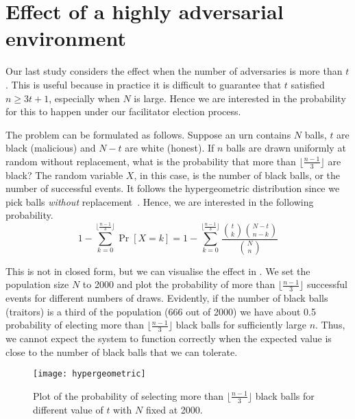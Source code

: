 \section{Effect of a highly adversarial environment}

Our last study considers the effect when the number of adversaries is more than $t$.
This is useful because in practice it is difficult to guarantee that $t$ satisfied $n \ge 3t + 1$, especially when $N$ is large.
Hence we are interested in the probability for this to happen under our facilitator election process.

The problem can be formulated as follows.
Suppose an urn contains $N$ balls, $t$ are black (malicious) and $N-t$ are white (honest).
If $n$ balls are drawn uniformly at random without replacement,
what is the probability that more than $\lfloor \frac{n-1}{3} \rfloor$ are black?
The random variable $X$, in this case, is the number of black balls, or the number of successful events.
It follows the hypergeometric distribution since we pick balls \emph{without} replacement~\cite{skala2013hypergeometric}.
Hence, we are interested in the following probability.
$$
1 - \sum_{k = 0}^{\lfloor \frac{n-1}{3} \rfloor} \Pr[X = k] = 
1 - \sum_{k = 0}^{\lfloor \frac{n-1}{3} \rfloor} \frac{ \binom{t}{k} \binom{N-t}{n-k} }{ \binom{N}{n} }
$$

This is not in closed form,
but we can visualise the effect in .
We set the population size $N$ to 2000
and plot the probability of more than $\lfloor \frac{n-1}{3} \rfloor$ successful events for different numbers of draws.
Evidently,
if the number of black balls (traitors) is a third of the population (666 out of 2000)
we have about 0.5 probability of electing more than $\lfloor \frac{n-1}{3} \rfloor$ black balls for sufficiently large $n$.
Thus, we cannot expect the system to function correctly when 
the expected value is close to the number of black balls that we can tolerate.

\begin{figure}[h]
  \centering
  \texttt{[image: hypergeometric]}
  \caption{Plot of the probability of selecting more than $\lfloor \frac{n-1}{3} \rfloor$ black balls for
  different value of $t$ with $N$ fixed at 2000.}
  \label{fig:hypergeometric}
\end{figure}

